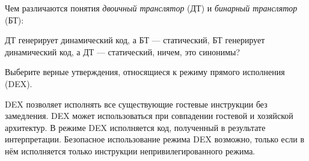 \begin{questions}
\question[3] Чем различаются понятия \textit{двоичный транслятор} (ДТ) и \textit{бинарный транслятор} (БТ):
\begin{choices}
    \choice ДТ генерирует динамический код, а БТ — статический,
    \choice БТ генерирует динамический код, а ДТ — статический,
    \correctchoice ничем, это синонимы?
\end{choices}

\question[3] Выберите верные утверждения, относящиеся к режиму прямого исполнения (DEX).
\begin{choices}
\choice DEX позволяет исполнять все существующие гостевые инструкции без замедления.
\correctchoice DEX может использоваться при совпадении гостевой и хозяйской архитектур.
\choice В режиме DEX исполняется код, полученный в результате интерпретации.
\correctchoice Безопасное использование режима DEX возможно, только если в нём исполняется только инструкции непривилегированного режима.
\end{choices}


\end{questions}


% 
% 
% 
% 
% 
% 
% 
%         
% 


 
 